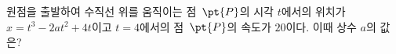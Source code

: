원점을 출발하여 수직선 위를 움직이는 점~$\pt{P}$의 시각 $t$에서의 위치가 $x=t^3-2at^2+4t$이고 $t=4$에서의 점~$\pt{P}$의 속도가 $20$이다. 이때 상수 $a$의 값은?
